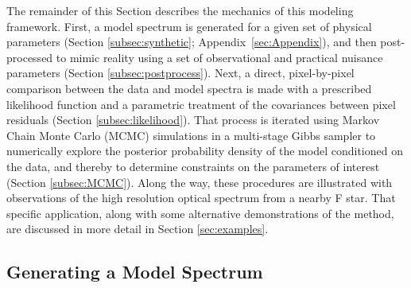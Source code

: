 \documentclass[iop,floatfix,numberedappendix,twocolappendix]{emulateapj}
\begin{document}
The remainder of this Section describes the mechanics of this modeling framework.  First, a model
spectrum is generated for a given set of physical parameters (Section \ref{subsec:synthetic};
Appendix~\ref{sec:Appendix}), and then post-processed to mimic reality using a set of observational
and practical nuisance parameters (Section \ref{subsec:postprocess}).  Next, a direct,
pixel-by-pixel comparison between the data and model spectra is made with a prescribed likelihood
function and a parametric treatment of the covariances between pixel residuals (Section
\ref{subsec:likelihood}).  That process is iterated using Markov Chain Monte Carlo (MCMC)
simulations in a multi-stage Gibbs sampler to numerically explore the posterior probability density
of the model conditioned on the data, and thereby to determine constraints on the parameters of
interest (Section \ref{subsec:MCMC}).  Along the way, these procedures are illustrated with
observations of the high resolution optical spectrum from a nearby F star.  That specific
application, along with some alternative demonstrations of the method, are discussed in more detail
in Section \ref{sec:examples}.


\subsection{Generating a Model Spectrum \label{subsec:synthetic}}
\end{document}
